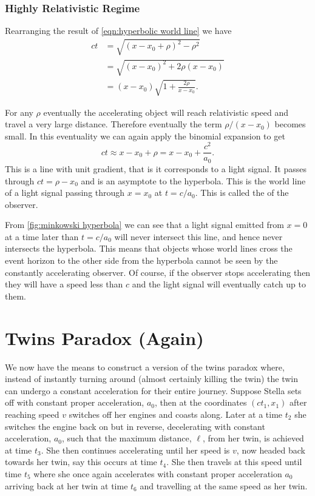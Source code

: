 \documentclass[fleqn]{NotesClass}
\begin{document}
    \subsubsection{Highly Relativistic Regime}
    Rearranging the result of \cref{eqn:hyperbolic world line} we have
    \begin{align}
        ct &= \sqrt{(x - x_0 + \rho)^2 - \rho^2}\\
        &= \sqrt{(x - x_0)^2 + 2\rho(x - x_0)}\\
        &= (x - x_0)\sqrt{1 + \frac{2\rho}{x - x_0}}.
    \end{align}
    
    For any \(\rho\) eventually the accelerating object will reach relativistic speed and travel a very large distance.
    Therefore eventually the term \(\rho/(x - x_0)\) becomes small.
    In this eventuality we can again apply the binomial expansion to get
    \begin{equation}
        ct \approx x - x_0 + \rho = x - x_0 + \frac{c^2}{a_0}.
    \end{equation}
    This is a line with unit gradient, that is it corresponds to a light signal.
    It passes through \(ct = \rho - x_0\) and is an asymptote to the hyperbola.
    This is the world line of a light signal passing through \(x = x_0\) at \(t = c/a_0\).
    This is called the  of the observer.
    
    From \cref{fig:minkowski hyperbola} we can see that a light signal emitted from \(x = 0\) at a time later than \(t = c/a_0\) will never intersect this line, and hence never intersects the hyperbola.
    This means that objects whose world lines cross the event horizon to the other side from the hyperbola cannot be seen by the constantly accelerating observer.
    Of course, if the observer stops accelerating then they will have a speed less than \(c\) and the light signal will eventually catch up to them.
    
    \section{Twins Paradox (Again)}
    We now have the means to construct a version of the twins paradox where, instead of instantly turning around (almost certainly killing the twin) the twin can undergo a constant acceleration for their entire journey.
    Suppose Stella sets off with constant proper acceleration, \(a_0\), then at the coordinates \((ct_1, x_1)\) after reaching speed \(v\) switches off her engines and coasts along.
    Later at a time \(t_2\) she switches the engine back on but in reverse, decelerating with constant acceleration, \(a_0\), such that the maximum distance, \(\ell\), from her twin, is achieved at time \(t_3\).
    She then continues accelerating until her speed is \(v\), now headed back towards her twin, say this occurs at time \(t_4\).
    She then travels at this speed until time \(t_5\) where she once again accelerates with constant proper acceleration \(a_0\) arriving back at her twin at time \(t_6\) and travelling at the same speed as her twin.
    
\end{document}
